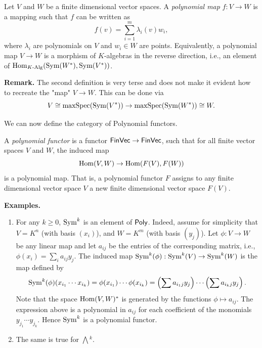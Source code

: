 \documentclass[../main.tex]{subfiles}
\begin{document}
\begin{defi}
    Let $V$ and $W$ be a finite dimensional vector spaces. A \emph{polynomial map}
    $f: V \to W$ is a mapping such that $f$ can be written as 
    \begin{equation*}
        f(v) = \sum_{i=1}^m \lambda_i(v) w_i,
    \end{equation*}
    where $\lambda_i$ are polynomials on $V$ and $w_i \in W$ are points.
    Equivalently, a polynomial map $V \to W$ is a morphism of $K$-algebras in
    the reverse direction, i.e., an element of $\operatorname{Hom}_{K\text{-Alg}}(\operatorname{Sym}(W^*),
    \operatorname{Sym}(V^*))$.
\end{defi}
\textbf{Remark.} 
The second definition is very terse and does not make it evident how to
recreate the "map" $V \to W$. This can be done via
$$V \cong \operatorname{maxSpec}(\operatorname{Sym}(V^*)) \to \operatorname{maxSpec}(\operatorname{Sym}(W^*)) \cong W.$$

We can now define the category of Polynomial functors.
\begin{defi}
    A \emph{polynomial functor} is a functor $\textnormal{$\textsf{FinVec}$} \to \textnormal{$\textsf{FinVec}$}$, such
    that for all finite vector spaces $V$ and $W$, the induced map
    \begin{equation*}
        \operatorname{Hom}(V, W) \to \operatorname{Hom}(F(V), F(W))
    \end{equation*} is a polynomial map. 
    That is, a polynomial functor $F$ assigns to any finite dimensional vector space $V$ 
    a new finite dimensional vector space $F(V)$. 
\end{defi}

\textbf{Examples.}
\begin{enumerate}[wide, labelindent=0pt,nolistsep]
    \item For any $k \geq 0$, $\operatorname{Sym}^k$ is an element of $\textnormal{$\textsf{Poly}$}$. Indeed, assume for
        simplicity that $V = K^n$ (with basis $(x_i)$), and $W = K^m$ (with
        basis $(y_j)$). Let $\phi: V \to W$ be 
        any linear map and let $a_{ij}$ be the entries of the corresponding matrix, 
        i.e., $\phi(x_i) = \sum_{i} a_{ij}y_j$. 
        The induced map $\operatorname{Sym}^k(\phi): \operatorname{Sym}^k(V) \to \operatorname{Sym}^k(W)$ is the map defined by
        \begin{equation*}
            \operatorname{Sym}^k(\phi)(x_{i_1} \cdots x_{i_k}) = \phi(x_{i_1}) \cdots \phi(x_{i_k})
            = \left(\sum a_{i_1j}y_j \right) \cdots \left(\sum a_{i_kj}y_j \right). 
        \end{equation*}
        Note that the space $\operatorname{Hom}(V,W)^*$ is generated by the functions 
        $\phi \mapsto a_{ij}$. The expression above is a polynomial in $a_{ij}$ for
        each coefficient of the monomials $y_{j_1}\cdots y_{j_k}$. Hence
        $\operatorname{Sym}^k$ is a polynomial functor.
    \item The same is true for $\bigwedge{}^k$.
\end{enumerate}
\end{document}
